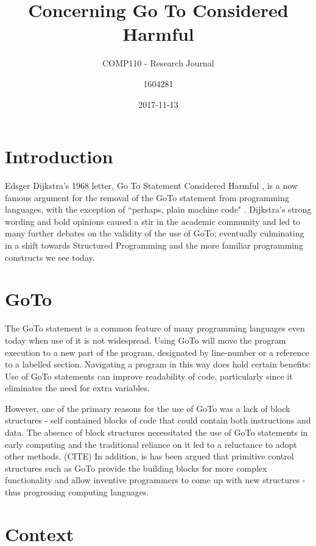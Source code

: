 \documentclass{scrartcl}
\title{Concerning Go To Considered Harmful}
\subtitle{COMP110 - Research Journal}
\date{2017-11-13}
\author{1604281}
\begin{document}
\maketitle
{}

\section{Introduction}

Edsger Dijkstra's 1968 letter, Go To Statement Considered Harmful \cite{dijkstragoto}, is a now famous argument for the removal of the GoTo statement from programming languages, with the exception of ``perhaps, plain machine code" \cite[p. ~147]{dijkstragoto}. Dijkstra's strong wording and bold opinions caused a stir in the academic community and led to many further debates on the validity of the use of GoTo; eventually culminating in a shift towards Structured Programming and the more familiar programming constructs we see today.

\section{GoTo}

The GoTo statement is a common feature of many programming languages even today when use of it is not widespread. Using GoTo will move the program execution to a new part of the program, designated by line-number or a reference to a labelled section. Navigating a program in this way does hold certain benefits: Use of GoTo statements can improve readability of code, particularly since it eliminates the need for extra variables. \cite{casefor} 

However, one of the primary reasons for the use of GoTo was a lack of block structures - self contained blocks of code that could contain both instructions and data. The absence of block structures necessitated the use of GoTo statements in early computing and the traditional reliance on it led to a reluctance to adopt other methods. (CITE) In addition, is has been argued that primitive control structures such as GoTo provide the building blocks for more complex functionality and allow inventive programmers to come up with new structures - thus progressing computing languages. \cite{casefor}


\section{Context}
\end{document}
